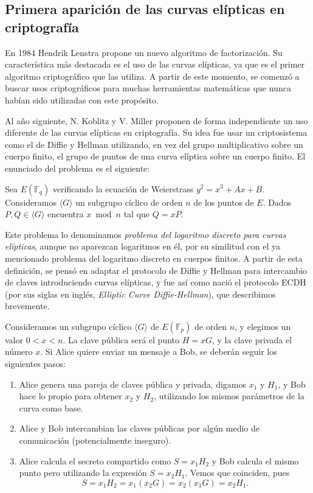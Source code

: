 \documentclass[
  a4paper,
  12pt,
  spanish,
]{scrartcl}
\begin{document}
\subsection{Primera aparición de las curvas elípticas en criptografía}


En 1984 Hendrik Lenstra propone un nuevo algoritmo de factorización. Su característica más destacada es el uso de las curvas elípticas, ya que es el primer algoritmo criptográfico que las utiliza. A partir de este momento, se comenzó a buscar usos criptográficos para muchas herramientas matemáticas que nunca habían sido utilizadas con este propósito.

Al año siguiente, N. Koblitz y V. Miller proponen de forma independiente un uso diferente de las curvas elípticas en criptografía. Su idea fue usar un criptosistema como el de Diffie y Hellman utilizando, en vez del grupo multiplicativo sobre un cuerpo finito, el grupo de puntos de una curva elíptica sobre un cuerpo finito. El enunciado del problema es el siguiente:
\begin{displayquote}
  Sea $E(\mathbb{F}_q)$ verificando la ecuación de Weierstrass $y^2 =x^3 + Ax + B$. Consideramos $\langle G \rangle$ un subgrupo cíclico de orden $n$ de los puntos de $E$. Dados $P,Q \in \langle G \rangle$ encuentra $x \bmod{n}$ tal que $Q=xP$. 
\end{displayquote} 

Este problema lo denominamos \textit{problema del logaritmo discreto para curvas elípticas}, aunque no aparezcan logaritmos en él, por su similitud con el ya mencionado problema del logaritmo discreto en cuerpos finitos. A partir de esta definición, se pensó en adaptar el protocolo de Diffie y Hellman para intercambio de claves introduciendo curvas elípticas, y fue así como nació el protocolo ECDH (por sus siglas en inglés, \textit{Elliptic Curve Diffie-Hellman}), que describimos brevemente.

    Consideramos un subgrupo cíclico $\langle G \rangle$ de $E(\mathbb{F}_p)$ de orden $n$, y elegimos un valor $0 < x < n$. La clave pública será el punto $H = xG$, y la clave privada el número $x$. Si Alice quiere enviar un mensaje a Bob, se deberán seguir los siguientes pasos:
    
    \begin{enumerate}
	\item Alice genera una pareja de claves pública y privada, digamos $x_1$ y $H_1$, y Bob hace lo propio para obtener $x_2$ y $H_2$, utilizando los mismos parámetros de la curva como base.
	\item Alice y Bob intercambian las claves públicas por algún medio de comunicación (potencialmente inseguro).
	\item Alice calcula el secreto compartido como $S = x_1H_2$ y Bob calcula el mismo punto pero utilizando la expresión $S = x_2H_1$. Vemos que coinciden, pues \[ S = x_1H_2 = x_1(x_2G) = x_2(x_1G) = x_2H_1. \]
\end{enumerate}
\end{document}
